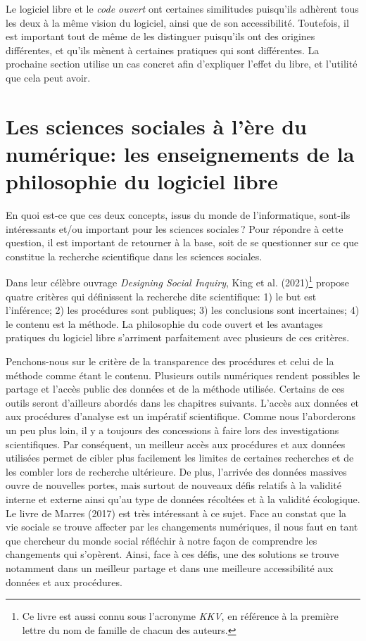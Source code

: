 \documentclass[
  letterpaper,
  DIV=11,
  numbers=noendperiod]{scrreprt}
\begin{document}
Le logiciel libre et le \emph{code ouvert} ont certaines similitudes
puisqu'ils adhèrent tous les deux à la même vision du logiciel, ainsi
que de son accessibilité. Toutefois, il est important tout de même de
les distinguer puisqu'ils ont des origines différentes, et qu'ils mènent
à certaines pratiques qui sont différentes. La prochaine section utilise
un cas concret afin d'expliquer l'effet du libre, et l'utilité que cela
peut avoir.

\section{Les sciences sociales à l'ère du numérique: les enseignements
de la philosophie du logiciel
libre}\label{les-sciences-sociales-uxe0-luxe8re-du-numuxe9rique-les-enseignements-de-la-philosophie-du-logiciel-libre}

En quoi est-ce que ces deux concepts, issus du monde de l'informatique,
sont-ils intéressants et/ou important pour les sciences sociales ? Pour
répondre à cette question, il est important de retourner à la base, soit
de se questionner sur ce que constitue la recherche scientifique dans
les sciences sociales.

Dans leur célèbre ouvrage \emph{Designing Social Inquiry}, King et al.
(2021)\footnote{Ce livre est aussi connu sous l'acronyme \emph{KKV}, en
  référence à la première lettre du nom de famille de chacun des
  auteurs.} propose quatre critères qui définissent la recherche dite
scientifique: 1) le but est l'inférence; 2) les procédures sont
publiques; 3) les conclusions sont incertaines; 4) le contenu est la
méthode. La philosophie du code ouvert et les avantages pratiques du
logiciel libre s'arriment parfaitement avec plusieurs de ces critères.

Penchons-nous sur le critère de la transparence des procédures et celui
de la méthode comme étant le contenu. Plusieurs outils numériques
rendent possibles le partage et l'accès public des données et de la
méthode utilisée. Certains de ces outils seront d'ailleurs abordés dans
les chapitres suivants. L'accès aux données et aux procédures d'analyse
est un impératif scientifique. Comme nous l'aborderons un peu plus loin,
il y a toujours des concessions à faire lors des investigations
scientifiques. Par conséquent, un meilleur accès aux procédures et aux
données utilisées permet de cibler plus facilement les limites de
certaines recherches et de les combler lors de recherche ultérieure. De
plus, l'arrivée des données massives ouvre de nouvelles portes, mais
surtout de nouveaux défis relatifs à la validité interne et externe
ainsi qu'au type de données récoltées et à la validité écologique. Le
livre de Marres (2017) est très intéressant à ce sujet. Face au constat
que la vie sociale se trouve affecter par les changements numériques, il
nous faut en tant que chercheur du monde social réfléchir à notre façon
de comprendre les changements qui s'opèrent. Ainsi, face à ces défis,
une des solutions se trouve notamment dans un meilleur partage et dans
une meilleure accessibilité aux données et aux procédures.
\end{document}
